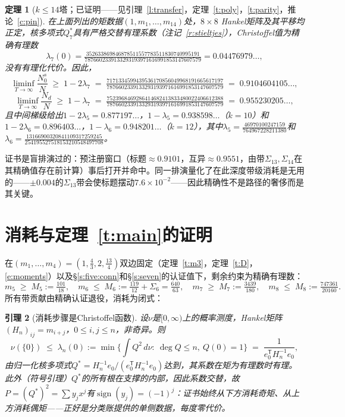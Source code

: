 \documentclass[11pt]{article}
\numberwithin{equation}{section}
\newtheorem{theorem}{定理}[section]
\newtheorem{lemma}[theorem]{引理}
\theoremstyle{definition}
\theoremstyle{remark}
\begin{document}
\begin{theorem}[$k\le14$塔；已证明——见引理~\ref{l:transfer}，定理~\ref{t:poly}，\ref{t:parity}，推论~\ref{c:pin}]\label{t:k14}
在上面列出的矩数据$(1,m_1,\dots,m_{14})$处，$8\times8$ Hankel矩阵及其平移均正定，核多项式$Q_7^{*}$具有严格交替有理系数（注记~\ref{r:stieltjes}），Christoffel值为精确有理数
\[
\lambda_7(0)=
\tfrac{352633869846878511557783511830740995191}{7876602339133293193971616991853147607579}
=0.04476979\ldots,
\]
没有有理化代价。因此，
\[
\liminf_{T\to\infty}\frac{N_0^{s}}{N}\;\ge\;1-2\lambda_7
\;=\;
\tfrac{7171334599439536170856049968191665617197}{7876602339133293193971616991853147607579}
\;=\;0.9104604105\ldots,
\]
\[
\liminf_{T\to\infty}\frac{N_d}{N}\;\ge\;1-\lambda_7
\;=\;
\tfrac{7523968469286414682413833480022406612388}{7876602339133293193971616991853147607579}
\;=\;0.955230205\ldots,
\]
且中间梯级给出$1-2\lambda_5=0.877197\ldots$，$1-\lambda_5=0.938598\ldots$（$k=10$）和$1-2\lambda_6=0.896403\ldots$，$1-\lambda_6=0.948201\ldots$（$k=12$），其中$\lambda_5=\tfrac{46970100247159}{764967228211380}$和$\lambda_6=
\tfrac{13166900320841109317259245}{254195527518153210548497708}$。
\end{theorem}

证书是盲排演过的：预注册窗口（标题$\approx0.9101$，互异$\approx0.9551$，由带$\Sigma_{13},\Sigma_{14}$在其精确值存在前计算）事后打开并命中。同一排演量化了在此深度带级消耗是无用的——$\pm0.004$的$\Sigma_{13}$带会使标题摆动$7.6\times10^{-2}$——因此精确性不是路径的奢侈而是其关键。

\section{消耗与定理~\ref{t:main}的证明}\label{s:lp}

在$(m_1,\dots,m_4)=(1,\tfrac43,2,\tfrac{13}4)$双边固定（定理~\ref{t:m3}，定理~\ref{t:D}，\eqref{e:moments}）以及\S\ref{s:five:conn}和\S\ref{s:seven}的认证值下，剩余约束为精确有理数：
\[
m_5\;\ge\;M_5:=\tfrac{101}{18},
\quad
m_6\;\le\;M_6:=\tfrac{119}{12}+\Sigma_6=\tfrac{640}{63},
\quad
m_7\;\ge\;M_7:=\tfrac{3439}{180},
\quad
m_8\;\le\;M_8:=\tfrac{747361}{20160}.
\]
所有带贡献由精确认证退役，消耗为闭式：

\begin{lemma}[消耗步骤是Christoffel函数]\label{l:christoffel}
设$\nu$是$[0,\infty)$上的概率测度，Hankel矩阵$(H_n)_{ij}=m_{i+j}$，$0\le i,j\le n$，非奇异。则
\[
\nu(\{0\})\;\le\;\lambda_n(0)
:=\min\{\textstyle\int Q^2\,d\nu:\ \deg Q\le n,\ Q(0)=1\}
\;=\;\frac1{e_0^{\mathsf T}H_n^{-1}e_0},
\]
由归一化核多项式$Q^*=H_n^{-1}e_0/(e_0^{\mathsf T}H_n^{-1}e_0)$达到，其系数在矩为有理数时\emph{有理}。此外（符号引理）$Q^*$的所有根在支撑的内部，因此系数交替，故$P=(Q^*)^2=\sum y_jx^j$有$\operatorname{sign}(y_j)=(-1)^j$：证书始终从下方消耗奇矩、从上方消耗偶矩——正好是分类账提供的单侧数据，每度零代价。
\end{lemma}
\end{document}
